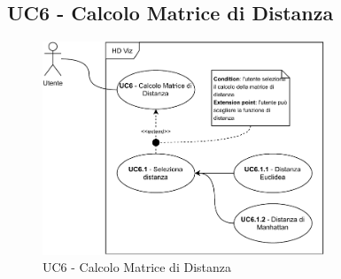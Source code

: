 \subsection{UC6 - Calcolo Matrice di Distanza}
\label{uc6}

    \begin{figure}[htbp]
        \centering
        \includegraphics[width=0.75\textwidth]{source/sections/casi-uso/diagrams/uc6.pdf}
        \caption{UC6 - Calcolo Matrice di Distanza}
        \label{fig:uc6}
    \end{figure}
    
